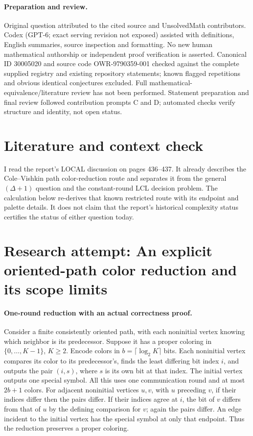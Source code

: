 \documentclass[11pt]{article}
\begin{document}
\paragraph{Preparation and review.}
Original question attributed to the cited source and UnsolvedMath contributors. Codex (GPT-6; exact serving revision not exposed) assisted with definitions, English summaries, source inspection and formatting. No new human mathematical authorship or independent proof verification is asserted. Canonical ID 30005020 and source code OWR-9790359-001 checked against the complete supplied registry and existing repository statements; known flagged repetitions and obvious identical conjectures excluded. Full mathematical-equivalence/literature review has not been performed. Statement preparation and final review followed contribution prompts C and D; automated checks verify structure and identity, not open status.
\label{end:30005020}

\section{Literature and context check}

I read the report's LOCAL discussion on pages 436--437. It already describes
the Cole--Vishkin path color-reduction route and separates it from the general
$(\Delta+1)$ question and the constant-round LCL decision problem.
The calculation below re-derives that known restricted route with its endpoint
and palette details. It does not claim that the report's historical complexity
status certifies the status of either question today.

\section{Research attempt: An explicit oriented-path color reduction and its scope limits}

\paragraph{One-round reduction with an actual correctness proof.}
Consider a finite consistently oriented path, with each noninitial vertex knowing
which neighbor is its predecessor. Suppose it has a proper coloring in
$\{0,\ldots,K-1\}$, $K\geq2$. Encode colors in $b=\lceil\log_2K\rceil$
bits. Each noninitial vertex compares its color to its predecessor's, finds
the least differing bit index $i$, and outputs the pair $(i,s)$, where $s$
is its own bit at that index. The initial vertex outputs one special symbol.
All this uses one communication round and at most $2b+1$ colors.
For adjacent noninitial vertices $u,v$, with $u$ preceding $v$, if their
indices differ then the pairs differ. If their indices agree at $i$, the bit
of $v$ differs from that of $u$ by the defining comparison for $v$; again the
pairs differ. An edge incident to the initial vertex has the special symbol
at only that endpoint. Thus the reduction preserves a proper coloring.
\end{document}
